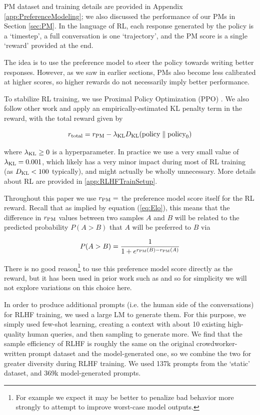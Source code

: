 PM dataset and training details are provided in Appendix \ref{app:PreferenceModeling}; we also discussed the performance of our PMs in Section \ref{sec:PM}. In the language of RL, each response generated by the policy is a `timestep', a full conversation is one `trajectory', and the PM score is a single `reward' provided at the end.

The idea is to use the preference model to steer the policy towards writing better responses. However, as we saw in earlier sections, PMs also become less calibrated at higher scores, so higher rewards do not necessarily imply better performance.

To stabilize RL training, we use Proximal Policy Optimization (PPO) \cite{PPO}. We also follow other work \cite{stiennon2020learning} and apply an empirically-estimated KL penalty term in the reward, with the total reward given by

\begin{equation}\label{eq:reward_with_kl}
r_{\rm total}=r_{\rm PM} -  \lambda_{\rm KL} D_{\rm KL}(\text{policy}\;\Vert\;\text{policy}_0)
\end{equation}

where  $\lambda_{\rm KL}\geq 0$ is a hyperparameter.  In practice  we use a very small value of $\lambda_{\rm KL} = 0.001$, which likely has a very minor impact during most of RL training (as $D_{\rm KL} < 100$ typically), and might actually be wholly unnecessary. More details about RL are provided in \ref{app:RLHFTrainSetup}.

Throughout this paper we use $r_{\rm PM} =$ the preference model score itself for the RL reward.  Recall that as implied by equation (\ref{eq:Elo}), this means that the difference in $r_{\rm PM}$ values between two samples $A$ and $B$ will be related to the predicted probability $P(A > B)$ that $A$ will be preferred to $B$ via

\begin{eqnarray}
P(A>B) = \frac{1}{1 + e^{r_{\rm PM}(B) - r_{\rm PM}(A)}} 
\end{eqnarray}

There is no good reason\footnote{For example we expect it may be better to penalize bad behavior more strongly to attempt to improve worst-case model outputs.} to use this preference model score directly as the reward, but it has been used in prior work such as \cite{stiennon2020learning} and so for simplicity we will not explore variations on this choice here.

In order to produce additional prompts (i.e. the human side of the conversations) for RLHF training, we used a large LM to generate them.  For this purpose, we simply used few-shot learning, creating a context with about 10 existing high-quality human queries, and then sampling to generate more.  We find that the sample efficiency of RLHF is roughly the same on the original crowdworker-written prompt dataset and the model-generated one, so we combine the two for greater diversity during RLHF training. We used 137k prompts from the `static' dataset, and 369k model-generated prompts.

